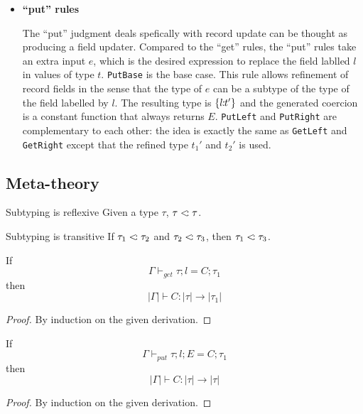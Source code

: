 \begin{itemize}
\item{\bf ``put'' rules}

  The ``put'' judgment deals spefically with record update can be thought as
  producing a field updater. Compared to the ``get'' rules, the ``put'' rules
  take an extra input $ e $, which is the desired expression to replace the
  field lablled $ l $ in values of type $ t $. \texttt{PutBase} is the base
  case. This rule allows refinement of record fields in the sense that the type
  of $ e $ can be a subtype of the type of the field labelled by $ l $. The
  resulting type is $ \{ l \!\!:\!\! t' \} $ and the generated coercion is a
  constant function that always returns $ E $. \texttt{PutLeft} and
  \texttt{PutRight} are complementary to each other: the idea is exactly the
  same as \texttt{GetLeft} and \texttt{GetRight} except that the refined type
  $ t_1' $ and $ t_2' $ is used.

\end{itemize}

\subsection{Meta-theory}

\begin{lemma}{Subtyping is reflexive} \label{sub-refl}
Given a type $ \tau $, $ \tau <\!: \tau $.
\end{lemma}

\begin{lemma}{Subtyping is transitive} \label{sub-trans}
If $ \tau_1 <\!: \tau_2 $ and $ \tau_2 <\!: \tau_3$,
then $ \tau_1 <\!: \tau_3$.
\end{lemma}


\begin{lemma} \label{type-get}
  If $$ \Gamma \vdash_{get} \tau ; l = C ; \tau_1 $$
  then $$ |\Gamma| \vdash C : |\tau| \to |\tau_1| $$
\end{lemma}

\begin{proof}
By induction on the given derivation.
\end{proof}

\begin{lemma} \label{type-put}
  If $$ \Gamma \vdash_{put} \tau ; l ; E = C ; \tau_1 $$
  then $$ |\Gamma| \vdash C : |\tau| \to |\tau| $$
\end{lemma}

\begin{proof}
By induction on the given derivation.
\end{proof}

